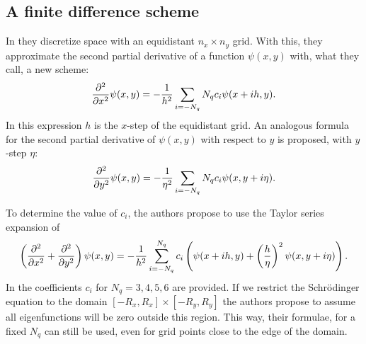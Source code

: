 \subsection{A finite difference scheme}

In \cite{wang_new_2009} they discretize space with an equidistant $n_x \times n_y$ grid. With this, they approximate the second partial derivative of a function $\psi(x, y)$ with, what they call, a new scheme:
$$
    {\pdv[2]{}{x}}\psi(x, y) = -\frac{1}{h^2}\sum_{i=-N_q}{N_q} c_i \psi(x + ih, y)\text{.}
$$
In this expression $h$ is the $x$-step of the equidistant grid. An analogous formula for the second partial derivative of $\psi(x, y)$ with respect to $y$ is proposed, with $y$-step $\eta$:
$$
    {\pdv[2]{}{y}}\psi(x, y) = -\frac{1}{\eta^2}\sum_{i=-N_q}{N_q} c_i \psi(x, y + i\eta)\text{.}
$$

To determine the value of $c_i$, the authors propose to use the Taylor series expansion of
$$
    \left({\pdv[2]{}{x}} + {\pdv[2]{}{y}}\right)\psi(x, y) = -\frac{1}{h^2} \sum_{i=-N_q}^{N_q} c_i \left(\psi(x+ih, y) + \left(\frac{h}{\eta}\right)^2\psi(x, y+i\eta)\right)\text{.}
$$
In \cite{wang_new_2009} the coefficients $c_i$ for $N_q = 3, 4, 5, 6$ are provided. If we restrict the Schrödinger equation to the domain $[-R_x, R_x] \times [-R_y, R_y]$ the authors propose to assume all eigenfunctions will be zero outside this region. This way, their formulae, for a fixed $N_q$ can still be used, even for grid points close to the edge of the domain.

